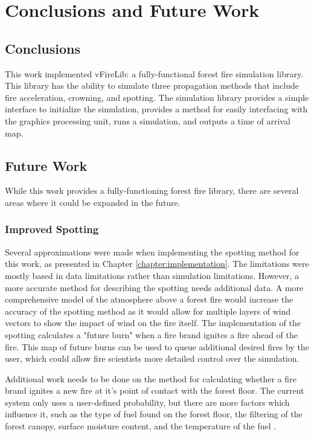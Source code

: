 \chapter{Conclusions and Future Work}
\label{chapter:conclusions}

\section{Conclusions}
This work implemented vFireLib: a fully-functional forest fire simulation library. This library has the ability to simulate three propagation methods that include fire acceleration, crowning, and spotting. The simulation library provides a simple interface to initialize the simulation, provides a method for easily interfacing with the graphics processing unit, runs a simulation, and outputs a time of arrival map. 

\section{Future Work}
While this work provides a fully-functioning forest fire library, there are several areas where it could be expanded in the future. 

\subsection{Improved Spotting} 
Several approximations were made when implementing the spotting method for this work, as presented in Chapter \ref{chapter:implementation}. The limitations were mostly based in data limitations rather than simulation limitations. However, a more accurate method for describing the spotting needs additional data. A more comprehensive model of the atmosphere above a forest fire would increase the accuracy of the spotting method as it would allow for multiple layers of wind vectors to show the impact of wind on the fire itself. The implementation of the spotting calculates a "future burn" when a fire brand ignites a fire ahead of the fire. This map of future burns can be used to queue additional desired fires by the user, which could allow fire scientists more detailed control over the simulation. 

Additional work needs to be done on the method for calculating whether a fire brand ignites a new fire at it's point of contact with the forest floor. The current system only uses a user-defined probability, but there are more factors which influence it, such as the type of fuel found on the forest floor, the filtering of the forest canopy, surface moisture content, and the temperature of the fuel \cite{bradshaw1984,blackmarr1972,bunting1974}.

